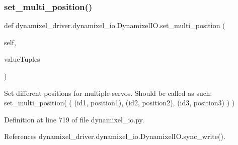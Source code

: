 \subsubsection{\texorpdfstring{set\+\_\+multi\+\_\+position()}{set\_multi\_position()}}
{\footnotesize\ttfamily def dynamixel\+\_\+driver.\+dynamixel\+\_\+io.\+Dynamixel\+I\+O.\+set\+\_\+multi\+\_\+position (\begin{DoxyParamCaption}\item[{}]{self,  }\item[{}]{value\+Tuples }\end{DoxyParamCaption})}

\begin{DoxyVerb}Set different positions for multiple servos.
Should be called as such:
set_multi_position( ( (id1, position1), (id2, position2), (id3, position3) ) )
\end{DoxyVerb}
 

Definition at line 719 of file dynamixel\+\_\+io.\+py.



References dynamixel\+\_\+driver.\+dynamixel\+\_\+io.\+Dynamixel\+I\+O.\+sync\+\_\+write().


